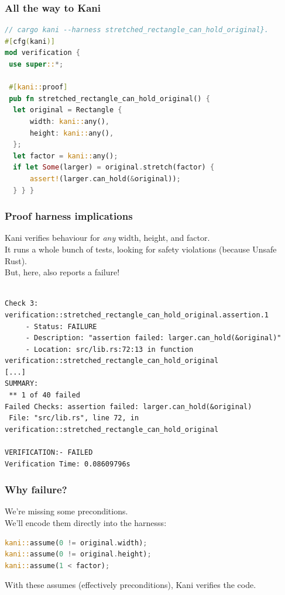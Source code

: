 \documentclass{beamer}
\newenvironment{changemargin}[1]{%
  \begin{list}{}{%
    \setlength{\topsep}{0pt}%
    \setlength{\leftmargin}{#1}%
    \setlength{\rightmargin}{1em}
    \setlength{\listparindent}{\parindent}%
    \setlength{\itemindent}{\parindent}%
    \setlength{\parsep}{\parskip}%
  }%
  \item[]}{\end{list}}
\begin{document}
\begin{frame}[fragile]
  \frametitle{All the way to Kani}
\begin{lstlisting}[language=Rust]
// cargo kani --harness stretched_rectangle_can_hold_original}.
#[cfg(kani)]
mod verification {
 use super::*;

 #[kani::proof]
 pub fn stretched_rectangle_can_hold_original() {
  let original = Rectangle {
      width: kani::any(),
      height: kani::any(),
  };
  let factor = kani::any();
  if let Some(larger) = original.stretch(factor) {
      assert!(larger.can_hold(&original));
  } } }
\end{lstlisting}
\end{frame}

\begin{frame}[fragile]
  \frametitle{Proof harness implications}
  \begin{changemargin}{1cm}
    \Large
    Kani verifies behaviour for \emph{any} width, height, and factor.\\[1em]
    It runs a whole bunch of tests, looking for safety violations (because Unsafe Rust).\\[1em]
    But, here, also reports a failure!
{ \scriptsize
\begin{verbatim}

Check 3: verification::stretched_rectangle_can_hold_original.assertion.1
	 - Status: FAILURE
	 - Description: "assertion failed: larger.can_hold(&original)"
	 - Location: src/lib.rs:72:13 in function verification::stretched_rectangle_can_hold_original
[...]
SUMMARY:
 ** 1 of 40 failed
Failed Checks: assertion failed: larger.can_hold(&original)
 File: "src/lib.rs", line 72, in verification::stretched_rectangle_can_hold_original

VERIFICATION:- FAILED
Verification Time: 0.08609796s
\end{verbatim}
}
  \end{changemargin}
\end{frame}

\begin{frame}[fragile]
  \frametitle{Why failure?}
  \begin{changemargin}{1cm}
    \Large
    We're missing some preconditions.\\[1em]
    We'll encode them directly into the harnesss:
\begin{lstlisting}[language=Rust]
kani::assume(0 != original.width);
kani::assume(0 != original.height);
kani::assume(1 < factor);          
\end{lstlisting}

With these \textsf{assume}s (effectively preconditions), Kani verifies the code.
  \end{changemargin}
\end{frame}
\end{document}
